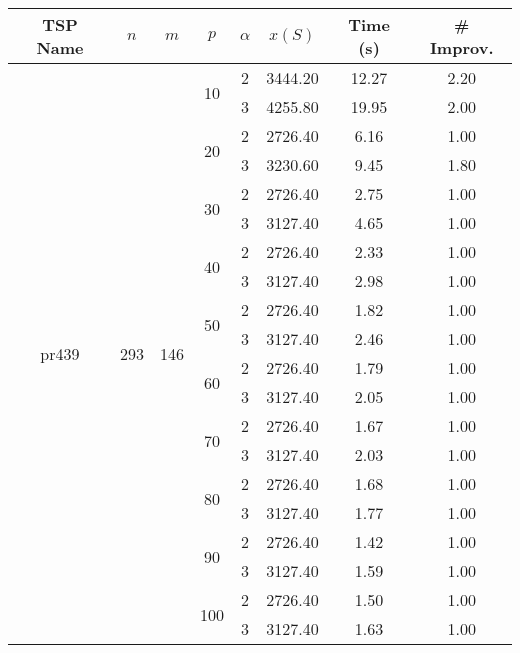 \begin{tabular}{|ccccc|ccc|}
\toprule
      TSP Name & $n$ & $m$ & $p$ & $\alpha$   & $x(S)$ &  Time (s) &  \# Improv. \\
\midrule
\multirow{20}{*}{pr439} & \multirow{20}{*}{293} & \multirow{20}{*}{146} & \multirow{2}{*}{10} & 2 & 3444.20 & 12.27 &     2.20 \\
      &     &     &     & 3 & 4255.80 & 19.95 &     2.00 \\
\cline{4-8}
      &     &     & \multirow{2}{*}{20} & 2 & 2726.40 &  6.16 &     1.00 \\
      &     &     &     & 3 & 3230.60 &  9.45 &     1.80 \\
\cline{4-8}
      &     &     & \multirow{2}{*}{30} & 2 & 2726.40 &  2.75 &     1.00 \\
      &     &     &     & 3 & 3127.40 &  4.65 &     1.00 \\
\cline{4-8}
      &     &     & \multirow{2}{*}{40} & 2 & 2726.40 &  2.33 &     1.00 \\
      &     &     &     & 3 & 3127.40 &  2.98 &     1.00 \\
\cline{4-8}
      &     &     & \multirow{2}{*}{50} & 2 & 2726.40 &  1.82 &     1.00 \\
      &     &     &     & 3 & 3127.40 &  2.46 &     1.00 \\
\cline{4-8}
      &     &     & \multirow{2}{*}{60} & 2 & 2726.40 &  1.79 &     1.00 \\
      &     &     &     & 3 & 3127.40 &  2.05 &     1.00 \\
\cline{4-8}
      &     &     & \multirow{2}{*}{70} & 2 & 2726.40 &  1.67 &     1.00 \\
      &     &     &     & 3 & 3127.40 &  2.03 &     1.00 \\
\cline{4-8}
      &     &     & \multirow{2}{*}{80} & 2 & 2726.40 &  1.68 &     1.00 \\
      &     &     &     & 3 & 3127.40 &  1.77 &     1.00 \\
\cline{4-8}
      &     &     & \multirow{2}{*}{90} & 2 & 2726.40 &  1.42 &     1.00 \\
      &     &     &     & 3 & 3127.40 &  1.59 &     1.00 \\
\cline{4-8}
      &     &     & \multirow{2}{*}{100} & 2 & 2726.40 &  1.50 &     1.00 \\
      &     &     &     & 3 & 3127.40 &  1.63 &     1.00 \\
\bottomrule
\end{tabular}

